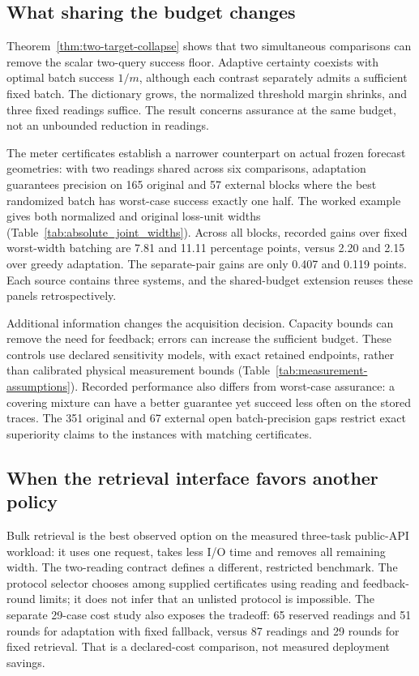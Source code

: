 \documentclass[12pt]{article}
\begin{document}
\subsection{What sharing the budget changes}
Theorem~\ref{thm:two-target-collapse} shows that two simultaneous comparisons
can remove the scalar two-query success floor. Adaptive certainty coexists
with optimal batch success $1/m$, although each contrast separately admits
a sufficient fixed batch. The dictionary grows, the normalized threshold
margin shrinks, and three fixed readings suffice. The result concerns
assurance at the same budget, not an unbounded reduction in readings.

The meter certificates establish a narrower counterpart on actual frozen
forecast geometries: with two readings shared across six comparisons,
adaptation guarantees precision on 165 original and 57 external blocks
where the best randomized batch has worst-case success exactly one half.
The worked example gives both normalized and original loss-unit widths
(Table~\ref{tab:absolute_joint_widths}). Across all blocks, recorded gains
over fixed worst-width batching are 7.81 and 11.11 percentage points, versus
2.20 and 2.15 over greedy adaptation. The separate-pair gains are only
0.407 and 0.119 points. Each source contains three systems, and the
shared-budget extension reuses these panels retrospectively.

Additional information changes the acquisition decision. Capacity bounds
can remove the need for feedback; errors can increase the sufficient budget.
These controls use declared sensitivity models, with exact retained
endpoints, rather than calibrated physical measurement bounds
(Table~\ref{tab:measurement-assumptions}). Recorded performance also differs
from worst-case assurance: a covering mixture can have a better guarantee
yet succeed less often on the stored traces. The 351 original and 67 external
open batch-precision gaps restrict exact superiority claims to the instances
with matching certificates.

\subsection{When the retrieval interface favors another policy}
Bulk retrieval is the best observed option on the measured three-task
public-API workload: it uses one request, takes less I/O time and removes
all remaining width. The two-reading contract defines a different,
restricted benchmark. The protocol selector chooses among supplied
certificates using reading and feedback-round limits; it does not infer
that an unlisted protocol is impossible. The separate 29-case cost study
also exposes the tradeoff: 65 reserved readings and 51 rounds for adaptation
with fixed fallback, versus 87 readings and 29 rounds for fixed retrieval.
That is a declared-cost comparison, not measured deployment savings.
\end{document}
